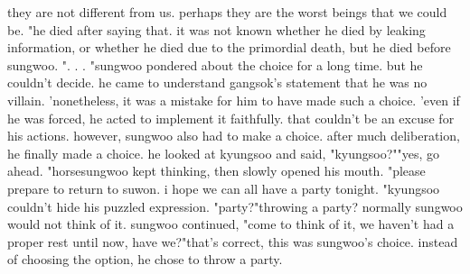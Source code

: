  they are not different from us.
 perhaps they are the worst beings that we could be.
"he died after saying that.
it was not known whether he died by leaking information, or whether he died due to the primordial death, but he died before sungwoo.
".
.
.
"sungwoo pondered about the choice for a long time.
 but he couldn't decide.
he came to understand gangsok's statement that he was no villain.
'nonetheless, it was a mistake for him to have made such a choice.
'even if he was forced, he acted to implement it faithfully.
 that couldn't be an excuse for his actions.
however, sungwoo also had to make a choice.
 after much deliberation, he finally made a choice.
 he looked at kyungsoo and said, "kyungsoo?""yes, go ahead.
"horsesungwoo kept thinking, then slowly opened his mouth.
 "please prepare to return to suwon.
 i hope we can all have a party tonight.
"kyungsoo couldn't hide his puzzled expression.
"party?"throwing a party? normally sungwoo would not think of it.
sungwoo continued, "come to think of it, we haven't had a proper rest until now, have we?"that's correct, this was sungwoo's choice.
 instead of choosing the option, he chose to throw a party.
 
